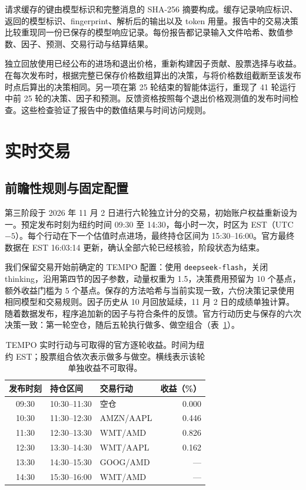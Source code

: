 \documentclass[conference]{IEEEtran}
\begin{document}
请求缓存的键由模型标识和完整消息的 SHA-256 摘要构成。缓存记录响应标识、返回的模型标识、fingerprint、解析后的输出以及 token 用量。报告中的交易决策比较重现同一份已保存的模型响应记录。每份报告都记录输入文件哈希、数值参数、因子、预测、交易行动与结算结果。

独立回放使用已经公布的进场和退出价格，重新构建因子贡献、股票选择与收益。在每次发布时，根据完整已保存价格数组算出的决策，与将价格数组截断至该发布时点后算出的决策相同。另一项在第 25 轮结束的智能体运行，重现了 41 轮运行中前 25 轮的决策、因子和预测。反馈资格按照每个退出价格观测值的发布时间检查。这些检查验证了报告中的数值结果与时间访问规则。

\FloatBarrier
\section{实时交易}
\subsection{前瞻性规则与固定配置}
第三阶段于 2026 年 11 月 2 日进行六轮独立计分的交易，初始账户权益重新设为一\cite{task2protocol,task2livefinal}。预定发布时刻为纽约时间 09:30 至 14:30，每小时一次，时区为 EST（UTC$-5$）。每个行动在下一个估值时点进场，最终持仓区间为 15:30--16:00。官方最终数据在 EST 16:03:14 更新，确认全部六轮已经核验，阶段状态为结束。

我们保留交易开始前确定的 TEMPO 配置：使用 \texttt{deepseek-flash}，关闭 thinking，沿用第四节的因子参数，动量权重为 1.5，决策费用预留为 10 个基点，额外收益门槛为 5 个基点。保存的方法哈希与当前实现一致，六份决策记录使用相同模型和交易规则。因子历史从 10 月回放延续，11 月 2 日的成绩单独计算。随着数据发布，程序追加新的因子与符合条件的反馈。官方行动历史与保存的六次决策一致：第一轮空仓，随后五轮执行做多、做空组合（表~\ref{tab:live_actions}）。

\begin{table}[!tb]
\centering
\caption{TEMPO 实时行动与可取得的官方逐轮收益。时间为纽约 EST；股票组合依次表示做多与做空。横线表示该轮单独收益不可取得。}
\label{tab:live_actions}
\small
\setlength{\tabcolsep}{3pt}
\begin{tabular}{cllr}
\toprule
发布时刻 & 持仓区间 & 交易行动 & 收益（\%）\\
\midrule
09:30 & 10:30--11:30 & 空仓 & 0.000\\
10:30 & 11:30--12:30 & AMZN/AAPL & 0.446\\
11:30 & 12:30--13:30 & WMT/AMD & 0.826\\
12:30 & 13:30--14:30 & WMT/AAPL & 0.162\\
13:30 & 14:30--15:30 & GOOG/AMD & ---\\
14:30 & 15:30--16:00 & WMT/AMD & ---\\
\bottomrule
\end{tabular}
\end{table}
\end{document}
